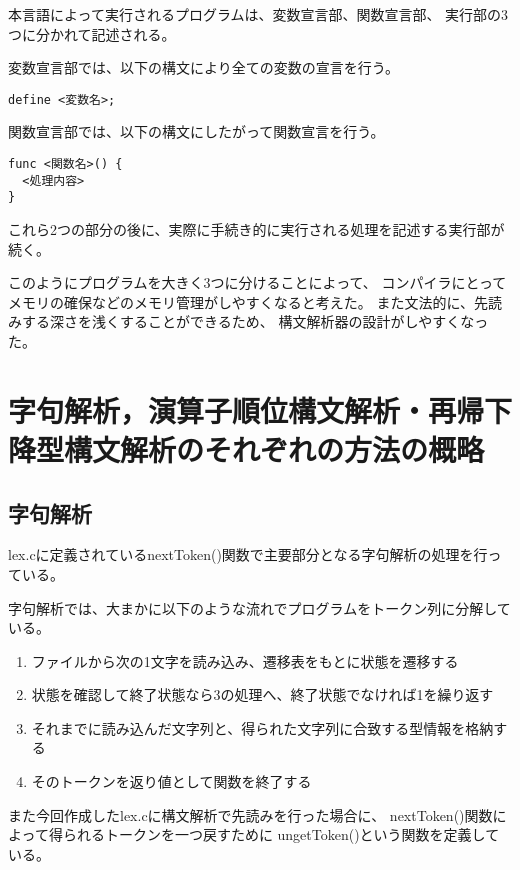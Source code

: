 \documentclass[11pt,a4j]{jarticle}
\begin{document}
本言語によって実行されるプログラムは、変数宣言部、関数宣言部、
実行部の3つに分かれて記述される。

変数宣言部では、以下の構文により全ての変数の宣言を行う。

\begin{verbatim}
define <変数名>;
\end{verbatim}

関数宣言部では、以下の構文にしたがって関数宣言を行う。

\begin{verbatim}
func <関数名>() {
  <処理内容>
}
\end{verbatim}


これら2つの部分の後に、実際に手続き的に実行される処理を記述する実行部が続く。

このようにプログラムを大きく3つに分けることによって、
コンパイラにとってメモリの確保などのメモリ管理がしやすくなると考えた。
また文法的に、先読みする深さを浅くすることができるため、
構文解析器の設計がしやすくなった。




\section{字句解析，演算子順位構文解析・再帰下降型構文解析のそれぞれの方法の概略}

\subsection{字句解析}
lex.cに定義されているnextToken()関数で主要部分となる字句解析の処理を行っている。

字句解析では、大まかに以下のような流れでプログラムをトークン列に分解している。

\begin{enumerate}
  \item ファイルから次の1文字を読み込み、遷移表をもとに状態を遷移する
  \item 状態を確認して終了状態なら3の処理へ、終了状態でなければ1を繰り返す
  \item それまでに読み込んだ文字列と、得られた文字列に合致する型情報を格納する
  \item そのトークンを返り値として関数を終了する
\end{enumerate}


また今回作成したlex.cに構文解析で先読みを行った場合に、
nextToken()関数によって得られるトークンを一つ戻すために
ungetToken()という関数を定義している。
\end{document}
